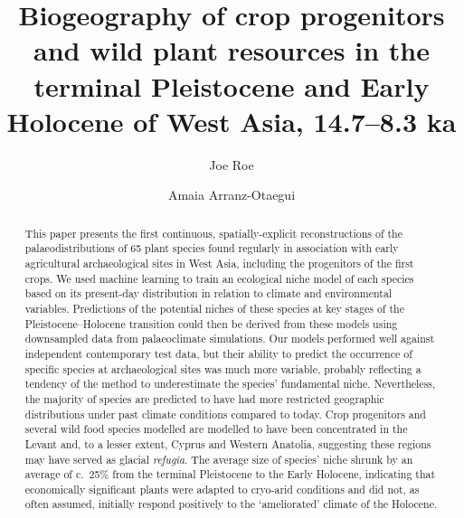 \documentclass[
  authoryear,
  preprint]{elsarticle}
\begin{document}
\begin{frontmatter}
\title{Biogeography of crop progenitors and wild plant resources in the
terminal Pleistocene and Early Holocene of West Asia, 14.7--8.3 ka}
\author[1,2]{Joe Roe%
%
}
\author[3]{Amaia Arranz-Otaegui%
%
}





        
\begin{abstract}
This paper presents the first continuous, spatially-explicit
reconstructions of the palaeodistributions of 65 plant species found
regularly in association with early agricultural archaeological sites in
West Asia, including the progenitors of the first crops. We used machine
learning to train an ecological niche model of each species based on its
present-day distribution in relation to climate and environmental
variables. Predictions of the potential niches of these species at key
stages of the Pleistocene--Holocene transition could then be derived
from these models using downsampled data from palaeoclimate simulations.
Our models performed well against independent contemporary test data,
but their ability to predict the occurrence of specific species at
archaeological sites was much more variable, probably reflecting a
tendency of the method to underestimate the species' fundamental niche.
Nevertheless, the majority of species are predicted to have had more
restricted geographic distributions under past climate conditions
compared to today. Crop progenitors and several wild food species
modelled are modelled to have been concentrated in the Levant and, to a
lesser extent, Cyprus and Western Anatolia, suggesting these regions may
have served as glacial \emph{refugia}. The average size of species'
niche shrunk by an average of c.~25\% from the terminal Pleistocene to
the Early Holocene, indicating that economically significant plants were
adapted to cryo-arid conditions and did not, as often assumed, initially
respond positively to the `ameliorated' climate of the Holocene.
\end{abstract}





\end{frontmatter}
    
\end{document}
